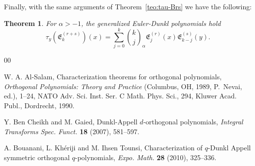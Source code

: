 \documentclass[10pt]{article}
\theoremstyle{plain}
\newtheorem{theorem}{Theorem}[section]
\theoremstyle{definition}
\numberwithin{equation}{section} %
\newcommand{\binoma}[2]{\binom{#1}{#2}_{\!\alpha}}
\newcommand{\E}{\mathfrak{E}}
\begin{document}
Finally, with the same arguments of Theorem~\ref{teo:tau-Brs} we have the following:

\begin{theorem}
For $\alpha>-1$, the generalized Euler-Dunkl polynomials hold
\begin{equation*}
  \tau_y(\E_k^{(r+s)})(x) = \sum_{j=0}^k \binoma{k}{j} \E_j^{(r)}(x)\E_{k-j}^{(s)}(y).
\end{equation*}
\end{theorem}


\begin{thebibliography}{00}

\small

W. A. Al-Salam,
Characterization theorems for orthogonal polynomials,
\textit{Orthogonal Polynomials: Theory and Practice}
(Columbus, OH, 1989, P.~Nevai, ed.), 1--24,
NATO Adv. Sci. Inst. Ser. C Math. Phys. Sci., 294,
Kluwer Acad. Publ., Dordrecht, 1990.



Y. Ben Cheikh and M. Gaied,
Dunkl-Appell $d$-orthogonal polynomials,
\textit{Integral Transforms Spec. Funct.}
\textbf{18} (2007), 581--597.


A. Bouanani, L. Kh\'eriji and M. Ihsen Tounsi,
Characterization of $q$-Dunkl Appell symmetric orthogonal $q$-polynomials,
\textit{Expo. Math.}
\textbf{28} (2010), 325--336.



\end{thebibliography}
\end{document}
